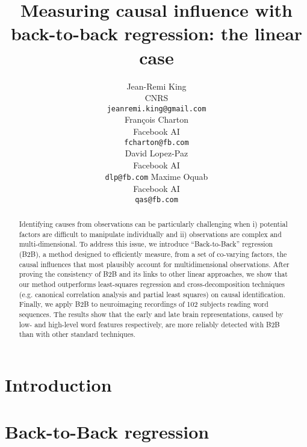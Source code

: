 \documentclass{article}
\title{Measuring causal influence with\\ back-to-back regression: the linear case}
\author{%
  Jean-Remi King\\
  CNRS\\
  \texttt{jeanremi.king@gmail.com} \\
  \And
  Fran\c{c}ois Charton\\
  Facebook AI\\
  \texttt{fcharton@fb.com}\\
  \And
  David Lopez-Paz\\
  Facebook AI\\
  \texttt{dlp@fb.com}
  \And
  Maxime Oquab\\
  Facebook AI\\
  \texttt{qas@fb.com}
}
\begin{document}
\maketitle

\begin{abstract}
Identifying causes from observations can be particularly challenging when i) potential factors are difficult to manipulate individually and ii) observations are complex and multi-dimensional.
To address this issue, we introduce ``Back-to-Back'' regression (B2B), a
method designed to efficiently measure, from a set of co-varying factors, the causal
influences that most plausibly account for multidimensional observations. After
proving the consistency of B2B and its links to other linear approaches, we show that our method outperforms
least-squares regression and cross-decomposition techniques (e.g.
canonical correlation analysis and partial least squares) on causal
identification. Finally, we apply B2B to
neuroimaging recordings of 102 subjects reading word sequences. The results
show that the early and late brain representations, caused by low- and high-level
word features respectively, are more reliably detected with B2B than with other standard techniques.

\end{abstract}

\section{Introduction}



\section{Back-to-Back regression}
\label{sec:algorithm}
\end{document}

